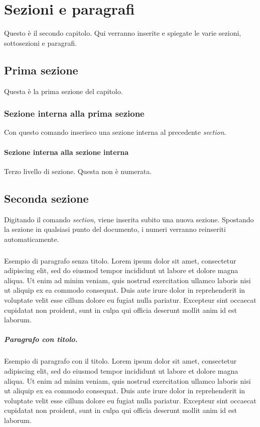 \chapter{Sezioni e paragrafi}
Questo è il secondo capitolo. Qui verranno inserite e spiegate le varie sezioni, sottosezioni e paragrafi.

\section{Prima sezione}
Questa è la prima sezione del capitolo.

\subsection{Sezione interna alla prima sezione}
Con questo comando inserisco una sezione interna al precedente \textit{section}.

\subsubsection{Sezione interna alla sezione interna}
Terzo livello di sezione. Questa non è numerata.

\section{Seconda sezione}
Digitando il comando \textit{section}, viene inserita subito una nuova sezione. Spostando la sezione in qualsiasi punto del documento, i numeri verranno reinseriti automaticamente.

\paragraph{} Esempio di paragrafo senza titolo. Lorem ipsum dolor sit amet, consectetur adipiscing elit, sed do eiusmod tempor incididunt ut labore et dolore magna aliqua. Ut enim ad minim veniam, quis nostrud exercitation ullamco laboris nisi ut aliquip ex ea commodo consequat. Duis aute irure dolor in reprehenderit in voluptate velit esse cillum dolore eu fugiat nulla pariatur. Excepteur sint occaecat cupidatat non proident, sunt in culpa qui officia deserunt mollit anim id est laborum.

\paragraph{Paragrafo con titolo.} Esempio di paragrafo con il titolo. Lorem ipsum dolor sit amet, consectetur adipiscing elit, sed do eiusmod tempor incididunt ut labore et dolore magna aliqua. Ut enim ad minim veniam, quis nostrud exercitation ullamco laboris nisi ut aliquip ex ea commodo consequat. Duis aute irure dolor in reprehenderit in voluptate velit esse cillum dolore eu fugiat nulla pariatur. Excepteur sint occaecat cupidatat non proident, sunt in culpa qui officia deserunt mollit anim id est laborum.